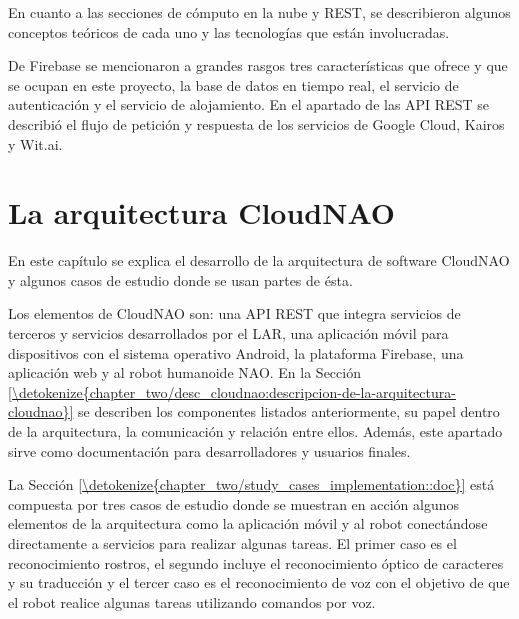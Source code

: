 \documentclass[letterpaper,12pt,spanish]{report}
\begin{document}
En cuanto a las secciones de cómputo en la nube
y REST, se describieron algunos conceptos teóricos
de cada uno y las tecnologías que están involucradas.

De Firebase se mencionaron a grandes rasgos 
tres características que ofrece y que se ocupan
en este proyecto, la base de datos en tiempo real,
el servicio de autenticación y el servicio de alojamiento.
En el apartado de las API REST se describió 
el flujo de petición y respuesta
de los servicios de Google Cloud, Kairos y Wit.ai.

\chapter{La arquitectura CloudNAO}
\label{\detokenize{chapter_two:la-arquitectura-cloudnao}}\label{\detokenize{chapter_two::doc}}

En este capítulo se explica el desarrollo de la 
arquitectura de software CloudNAO y algunos casos de 
estudio donde se usan partes de ésta.

Los elementos de CloudNAO son: una API REST que integra servicios de terceros y servicios desarrollados por el LAR, una aplicación móvil para 
dispositivos con el sistema operativo Android, la
plataforma Firebase, una aplicación web y 
al robot humanoide NAO.  En la Sección 
\ref{\detokenize{chapter_two/desc_cloudnao:descripcion-de-la-arquitectura-cloudnao}} se describen los componentes 
listados anteriormente, su papel dentro de la arquitectura, la comunicación y relación entre ellos. 
Además, este apartado sirve como documentación para
desarrolladores y usuarios finales.

La Sección \ref{\detokenize{chapter_two/study_cases_implementation::doc}} está compuesta por tres casos de estudio
donde se muestran en acción algunos elementos de la arquitectura como la aplicación móvil y al robot conectándose directamente a servicios para realizar algunas tareas. El primer caso es el 
reconocimiento rostros, el segundo incluye el reconocimiento
óptico de caracteres y su traducción y el tercer caso es
el reconocimiento de voz con el objetivo de que
el robot realice algunas tareas utilizando comandos por voz.
\end{document}
